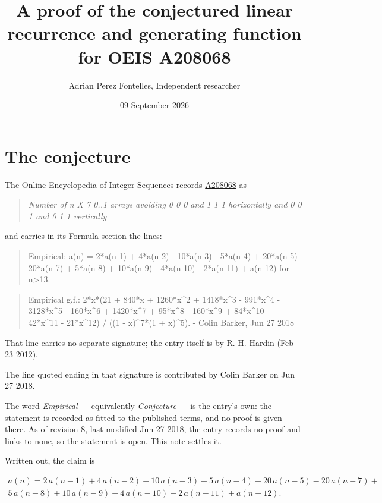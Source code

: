 \documentclass[11pt]{article}
\title{A proof of the conjectured linear recurrence and generating function for OEIS A208068}
\author{Adrian Perez Fontelles, Independent researcher}
\date{09 September 2026}
\theoremstyle{definition}
\begin{document}
\maketitle
\section{The conjecture}

The Online Encyclopedia of Integer Sequences records \href{https://oeis.org/A208068}{A208068} as

\begin{quote}\itshape Number of n X 7 0..1 arrays avoiding 0 0 0 and 1 1 1 horizontally and 0 0 1 and 0 1 1 vertically\end{quote}

and carries in its Formula section the lines:

\begin{quote}\ttfamily Empirical: a(n) = 2*a(n-1) + 4*a(n-2) - 10*a(n-3) - 5*a(n-4) + 20*a(n-5) - 20*a(n-7) + 5*a(n-8) + 10*a(n-9) - 4*a(n-10) - 2*a(n-11) + a(n-12) for n>13.\end{quote}

\begin{quote}\ttfamily Empirical g.f.: 2*x*(21 + 840*x + 1260*x\textasciicircum{}2 + 1418*x\textasciicircum{}3 - 991*x\textasciicircum{}4 - 3128*x\textasciicircum{}5 - 160*x\textasciicircum{}6 + 1420*x\textasciicircum{}7 + 95*x\textasciicircum{}8 - 160*x\textasciicircum{}9 + 84*x\textasciicircum{}10 + 42*x\textasciicircum{}11 - 21*x\textasciicircum{}12) / ((1 - x)\textasciicircum{}7*(1 + x)\textasciicircum{}5). - Colin Barker, Jun 27 2018\end{quote}

That line carries no separate signature; the entry itself is by R. H. Hardin (Feb 23 2012).

The line quoted ending in that signature is contributed by Colin Barker on Jun 27 2018.

The word {\itshape Empirical} --- equivalently {\itshape Conjecture} --- is the entry's own: the statement is recorded as fitted to the published terms, and no proof is given there. As of revision 8, last modified Jun 27 2018, the entry records no proof and links to none, so the statement is open. This note settles it.

Written out, the claim is

\begin{multline*} a(n) = 2\,a(n-1) + 4\,a(n-2) - 10\,a(n-3) - 5\,a(n-4) + 20\,a(n-5) - 20\,a(n-7) + \\ 5\,a(n-8) + 10\,a(n-9) - 4\,a(n-10) - 2\,a(n-11) + a(n-12). \end{multline*}
\end{document}
